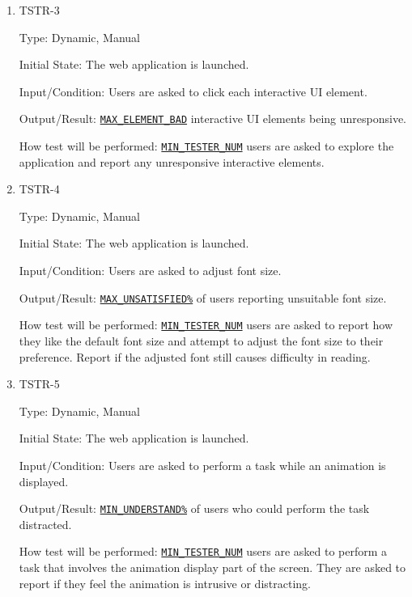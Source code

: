 \documentclass[12pt, titlepage]{article}
\begin{document}
\begin{enumerate}
\item{TSTR-3\\}\label{TSTR-3}

Type: Dynamic, Manual
					
Initial State: The web application is launched.
					
Input/Condition: Users are asked to click each interactive UI element.
					
Output/Result: \hyperref[MAX_ELEMENT_BAD]{\texttt{MAX\_ELEMENT\_BAD}} interactive UI elements being unresponsive.
					
How test will be performed: \hyperref[MIN_TESTER_NUM]{\texttt{MIN\_TESTER\_NUM}} users are asked to explore the application and report any unresponsive interactive elements.

\item{TSTR-4\\}\label{TSTR-4}

Type: Dynamic, Manual
					
Initial State: The web application is launched.
					
Input/Condition: Users are asked to adjust font size.
					
Output/Result: \hyperref[MAX_UNSATISFIED]{\texttt{MAX\_UNSATISFIED\%}} of users reporting unsuitable font size.
					
How test will be performed: \hyperref[MIN_TESTER_NUM]{\texttt{MIN\_TESTER\_NUM}} users are asked to report how they like the default font size and attempt to adjust the font size to their preference. Report if the adjusted font still causes difficulty in reading.

\item{TSTR-5\\}\label{TSTR-5}

Type: Dynamic, Manual
					
Initial State: The web application is launched.
					
Input/Condition: Users are asked to perform a task while an animation is displayed.
					
Output/Result: \hyperref[MIN_UNDERSTAND]{\texttt{MIN\_UNDERSTAND\%}} of users who could perform the task distracted.
					
How test will be performed: \hyperref[MIN_TESTER_NUM]{\texttt{MIN\_TESTER\_NUM}} users are asked to perform a task that involves the animation display part of the screen.  They are asked to report if they feel the animation is intrusive or distracting.
\end{enumerate}
\end{document}
